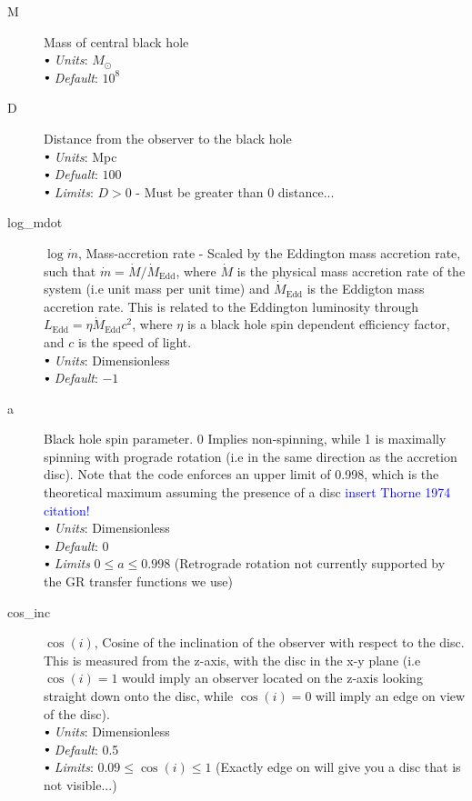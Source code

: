 \documentclass[a4paper, 11pt, times, onecolumn]{article}
\newcommand{\Msol}{M_{\odot}}
\newcommand{\mdot}{\dot{m}}
\newcommand{\Mdot}{\dot{M}}
\newcommand{\Mdedd}{\dot{M}_{\mathrm{Edd}}}
\newcommand{\Ledd}{L_{\mathrm{Edd}}}
\newcommand{\sbt}{\,\begin{picture}(-1,1)(-1,-3)\circle*{3}\end{picture}\ }
\begin{document}
\begin{description}
	\item[M] Mass of central black hole \\
		$\sbt$ {\it Units}: $\Msol$ \\
		$\sbt$ {\it Default}: $10^{8}$ \\

	
	\item[D]  Distance from the observer to the black hole \\
		$\sbt$ {\it Units}: Mpc \\
		$\sbt$ {\it Defualt}: $100$ \\
		$\sbt$ {\it Limits}: $D>0$ - Must be greater than 0 distance...
	
	\item[log\_mdot] $\log \mdot$, Mass-accretion rate - Scaled by the Eddington mass accretion rate, such that $\mdot = \Mdot/\Mdedd$, where $\Mdot$ is the physical mass accretion rate of the system (i.e unit mass per unit time) and $\Mdedd$ is the Eddigton mass accretion rate. This is related to the Eddington luminosity through $\Ledd = \eta \Mdedd c^{2}$, where $\eta$ is a black hole spin dependent efficiency factor, and $c$ is the speed of light. \\
		$\sbt$ {\it Units}: Dimensionless \\
		$\sbt$ {\it Default}: $-1$ \\
	
	\item[a] Black hole spin parameter. 0 Implies non-spinning, while 1 is maximally spinning with prograde rotation (i.e in the same direction as the accretion disc). Note that the code enforces an upper limit of 0.998, which is the theoretical maximum assuming the presence of a disc \textcolor{blue}{insert Thorne 1974 citation!} \\
		$\sbt$ {\it Units}: Dimensionless \\
		$\sbt$ {\it Default}: $0$ \\
		$\sbt$ {\it Limits} $0 \leq a \leq 0.998$ (Retrograde rotation not currently supported by the GR transfer functions we use)
	
	\item[cos\_inc]  $\cos(i)$, Cosine of the inclination of the observer with respect to the disc. This is measured from the z-axis, with the disc in the x-y plane (i.e $\cos(i) = 1$ would imply an observer located on the z-axis looking straight down onto the disc, while $\cos(i) = 0$ will imply an edge on view of the disc). \\
		$\sbt$ {\it Units}: Dimensionless \\
		$\sbt$ {\it Default}: 0.5 \\
		$\sbt$ {\it Limits}: $0.09 \leq \cos(i) \leq 1$ (Exactly edge on will give you a disc that is not visible...) 
		

\end{description}
\end{document}
